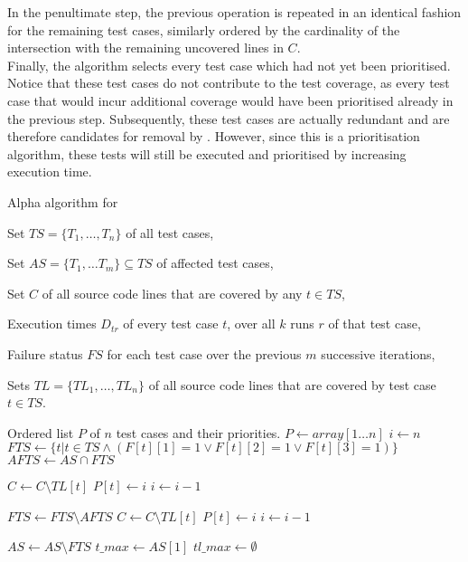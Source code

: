 \noindent In the penultimate step, the previous operation is repeated in an identical fashion for the remaining test cases, similarly ordered by the cardinality of the intersection with the remaining uncovered lines in $C$.\\

\noindent Finally, the algorithm selects every test case which had not yet been prioritised. Notice that these test cases do not contribute to the test coverage, as every test case that would incur additional coverage would have been prioritised already in the previous step. Subsequently, these test cases are actually redundant and are therefore candidates for removal by \tsm{}. However, since this is a prioritisation algorithm, these tests will still be executed and prioritised by increasing execution time.

\begin{algorithm}[htbp]
\caption{Alpha algorithm for \tcp{}}
\label{alg:alpha}
\begin{algorithmic}[1]
	 Set $TS = \{T_1, \dots, T_n\}$ of all test cases,
	
	Set $AS = \{T_1, \dots T_m\} \subseteq TS$ of affected test cases,
	
	Set $C$ of all source code lines that are covered by any $t \in TS$,
	
	Execution times $D_{tr}$ of every test case $t$, over all $k$ runs $r$ of that test case,
	
	Failure status $FS$ for each test case over the previous $m$ successive iterations,
	
	Sets $TL = \{TL_1, \dots, TL_n\}$ of all source code lines that are covered by test case $t \in TS$.
	
	 Ordered list $P$ of $n$ test cases and their priorities.
	\State $P \gets array[1 \dots n]$ 
	\State $i \gets n$
	\State $FTS \gets \{t \vert t \in TS \wedge (F[t][1] = 1 \vee F[t][2] = 1 \vee F[t][3] = 1)\}$
	\State $AFTS \gets AS \cap FTS$
	
	 
		\State $C \gets C \setminus TL[t]$
		\State $P[t] \gets i$
		\State $i \gets i - 1$
	\EndFor
	
	\State $FTS \gets FTS \setminus AFTS$
	 
		\State $C \gets C \setminus TL[t]$
		\State $P[t] \gets i$
		\State $i \gets i - 1$
	\EndFor
	
	\State $AS \gets AS \setminus FTS$
		\State $t\_max \gets AS[1]$ 
		\State $tl\_max \gets \emptyset$
		

\end{algorithmic}
\end{algorithm}
